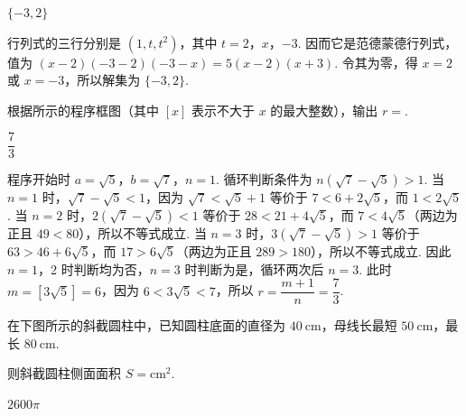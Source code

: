 \begin{answer}
\(\{-3,2\}\)
\end{answer}

\begin{solution}
行列式的三行分别是 \((1,t,t^2)\)，其中 \(t=2\)，\(x\)，\(-3\). 因而它是范德蒙德行列式，值为 \((x-2)(-3-2)(-3-x)=5(x-2)(x+3)\). 令其为零，得 \(x=2\) 或 \(x=-3\)，所以解集为 \(\{-3,2\}\).
\end{solution}

\begin{problem}
根据所示的程序框图（其中 \([x]\) 表示不大于 \(x\) 的最大整数），输出 \(r=\)\fillinblank{}.

\end{problem}

\begin{answer}
\(\dfrac{7}{3}\)
\end{answer}

\begin{solution}
程序开始时 \(a=\sqrt5\)，\(b=\sqrt7\)，\(n=1\). 循环判断条件为 \(n(\sqrt7-\sqrt5)>1\). 当 \(n=1\) 时，\(\sqrt7-\sqrt5<1\)，因为 \(\sqrt7<\sqrt5+1\) 等价于 \(7<6+2\sqrt5\)，而 \(1<2\sqrt5\). 当 \(n=2\) 时，\(2(\sqrt7-\sqrt5)<1\) 等价于 \(28<21+4\sqrt5\)，而 \(7<4\sqrt5\)（两边为正且 \(49<80\)），所以不等式成立. 当 \(n=3\) 时，\(3(\sqrt7-\sqrt5)>1\) 等价于 \(63>46+6\sqrt5\)，而 \(17>6\sqrt5\)（两边为正且 \(289>180\)），所以不等式成立. 因此 \(n=1\)，\(2\) 时判断均为否，\(n=3\) 时判断为是，循环两次后 \(n=3\). 此时 \(m=[3\sqrt5]=6\)，因为 \(6<3\sqrt5<7\)，所以 \(r=\dfrac{m+1}{n}=\dfrac{7}{3}\).
\end{solution}

\begin{problem}
在下图所示的斜截圆柱中，已知圆柱底面的直径为 \(40\mathrm{~cm}\)，母线长最短 \(50\mathrm{~cm}\)，最长 \(80\mathrm{~cm}\).

则斜截圆柱侧面面积 \(S=\)\fillinblank{}\(\mathrm{cm}^2\).

\begin{center}
\end{center}
\end{problem}

\begin{answer}
\(2600\pi\)
\end{answer}

